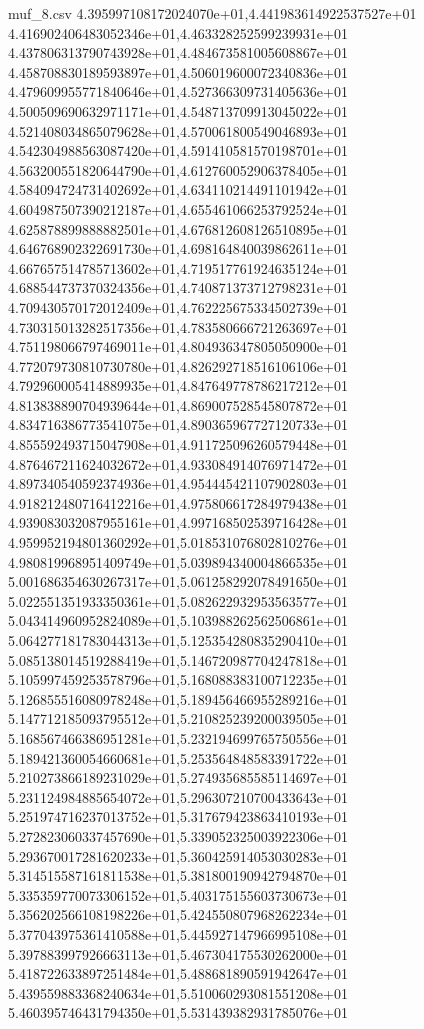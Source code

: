 \begin{filecontents*}{muf_8.csv}
4.395997108172024070e+01,4.441983614922537527e+01
4.416902406483052346e+01,4.463328252599239931e+01
4.437806313790743928e+01,4.484673581005608867e+01
4.458708830189593897e+01,4.506019600072340836e+01
4.479609955771840646e+01,4.527366309731405636e+01
4.500509690632971171e+01,4.548713709913045022e+01
4.521408034865079628e+01,4.570061800549046893e+01
4.542304988563087420e+01,4.591410581570198701e+01
4.563200551820644790e+01,4.612760052906378405e+01
4.584094724731402692e+01,4.634110214491101942e+01
4.604987507390212187e+01,4.655461066253792524e+01
4.625878899888882501e+01,4.676812608126510895e+01
4.646768902322691730e+01,4.698164840039862611e+01
4.667657514785713602e+01,4.719517761924635124e+01
4.688544737370324356e+01,4.740871373712798231e+01
4.709430570172012409e+01,4.762225675334502739e+01
4.730315013282517356e+01,4.783580666721263697e+01
4.751198066797469011e+01,4.804936347805050900e+01
4.772079730810730780e+01,4.826292718516106106e+01
4.792960005414889935e+01,4.847649778786217212e+01
4.813838890704939644e+01,4.869007528545807872e+01
4.834716386773541075e+01,4.890365967727120733e+01
4.855592493715047908e+01,4.911725096260579448e+01
4.876467211624032672e+01,4.933084914076971472e+01
4.897340540592374936e+01,4.954445421107902803e+01
4.918212480716412216e+01,4.975806617284979438e+01
4.939083032087955161e+01,4.997168502539716428e+01
4.959952194801360292e+01,5.018531076802810276e+01
4.980819968951409749e+01,5.039894340004866535e+01
5.001686354630267317e+01,5.061258292078491650e+01
5.022551351933350361e+01,5.082622932953563577e+01
5.043414960952824089e+01,5.103988262562506861e+01
5.064277181783044313e+01,5.125354280835290410e+01
5.085138014519288419e+01,5.146720987704247818e+01
5.105997459253578796e+01,5.168088383100712235e+01
5.126855516080978248e+01,5.189456466955289216e+01
5.147712185093795512e+01,5.210825239200039505e+01
5.168567466386951281e+01,5.232194699765750556e+01
5.189421360054660681e+01,5.253564848583391722e+01
5.210273866189231029e+01,5.274935685585114697e+01
5.231124984885654072e+01,5.296307210700433643e+01
5.251974716237013752e+01,5.317679423863410193e+01
5.272823060337457690e+01,5.339052325003922306e+01
5.293670017281620233e+01,5.360425914053030283e+01
5.314515587161811538e+01,5.381800190942794870e+01
5.335359770073306152e+01,5.403175155603730673e+01
5.356202566108198226e+01,5.424550807968262234e+01
5.377043975361410588e+01,5.445927147966995108e+01
5.397883997926663113e+01,5.467304175530262000e+01
5.418722633897251484e+01,5.488681890591942647e+01
5.439559883368240634e+01,5.510060293081551208e+01
5.460395746431794350e+01,5.531439382931785076e+01

\end{filecontents*}
